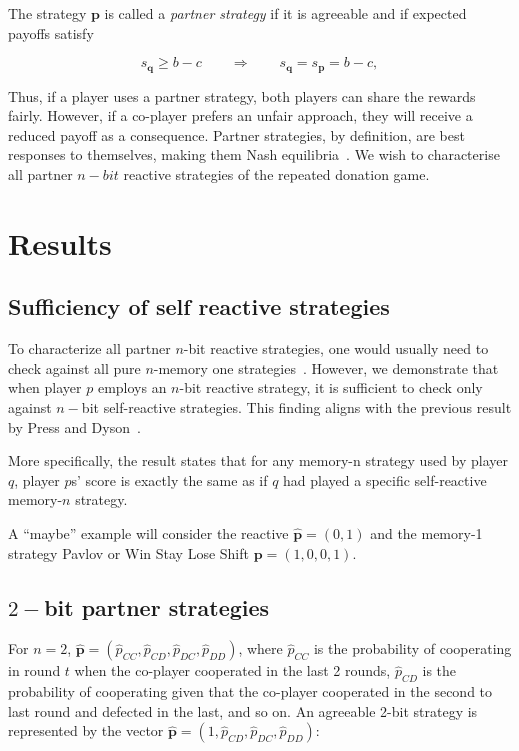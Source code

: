 \documentclass{article}
\theoremstyle{definition}
\begin{document}
The strategy $\mathbf{p}$ is called a {\it partner strategy} if it is agreeable
and if expected payoffs satisfy

\begin{equation} \label{Eq:partner}
    s_{\mathbf{q}} \geq b\!-\!c \qquad \Rightarrow \qquad s_{\mathbf{q}} = s_{\mathbf{p}} =  b\!-\!c,
\end{equation}

Thus, if a player uses a partner strategy, both players can share the rewards
fairly. However, if a co-player prefers an unfair approach, they will receive a
reduced payoff as a consequence. Partner strategies, by definition, are best
responses to themselves, making them Nash equilibria~\cite{Hilbe:GEB:2015}. We
wish to characterise all partner $n-bit$ reactive strategies of the repeated
donation game.

\section{Results}

\subsection{Sufficiency of self reactive strategies}

To characterize all partner $n$-bit reactive strategies, one would usually
need to check against all pure $n$-memory one strategies~\cite{mcavoy:PRSA:2019}.
However, we demonstrate that when player $p$ employs an $n$-bit reactive strategy,
it is sufficient to check only against $n-$bit self-reactive strategies. This
finding aligns with the previous result by Press and Dyson~\cite{press:PNAS:2012}.

More specifically, the result states that for any memory-n strategy used by
player $q$, player $p$s' score is exactly the same as if $q$ had played a
specific self-reactive memory-$n$ strategy.

A ``maybe'' example will consider the reactive $\mathbf{\hat{p}} = (0, 1)$ and the
memory-1 strategy Pavlov or Win Stay Lose Shift $\mathbf{p} = (1, 0, 0, 1)$.

\subsection{$2-$bit partner strategies}

For $n=2$, $\mathbf{\hat{p}}=(\hat{p}_{CC}, \hat{p}_{CD}, \hat{p}_{DC}, \hat{p}_{DD})$, where
$\hat{p}_{CC}$ is the probability of cooperating in round \(t\) when the
co-player cooperated in the last 2 rounds, $\hat{p}_{CD}$ is the probability of
cooperating given that the co-player cooperated in the second to last round and
defected in the last, and so on. An agreeable 2-bit strategy is represented by
the vector $\mathbf{\hat{p}}=(1, \hat{p}_{CD}, \hat{p}_{DC}, \hat{p}_{DD})$:
\end{document}
